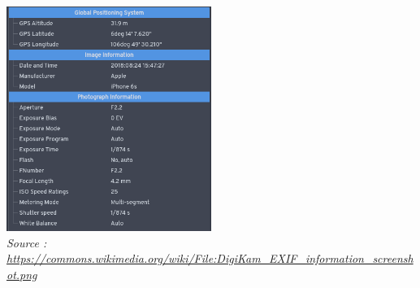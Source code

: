 \documentclass[
  11pt,
]{article}
\begin{document}
\includegraphics[width=0.5\textwidth,height=\textheight]{images/exif.png}\\

\emph{Source :
\url{https://commons.wikimedia.org/wiki/File:DigiKam_EXIF_information_screenshot.png}}
\end{document}
